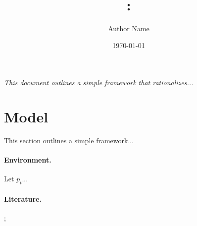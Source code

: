 \documentclass[letterpaper,12pt]{article}
\title{\paper: \note}
\author{Author Name}
\date{{\usdate\today}}
\begin{document}
\maketitle

{
\itshape
This document outlines a simple framework that rationalizes...
}

\section{Model}
This section outlines a simple framework...

\paragraph{Environment.}
Let $p_{t}$...

\paragraph{Literature.}
\citet*{Rosen-1974-JPE}; \citet*{Stigler-1961-JPE}



\end{document}
